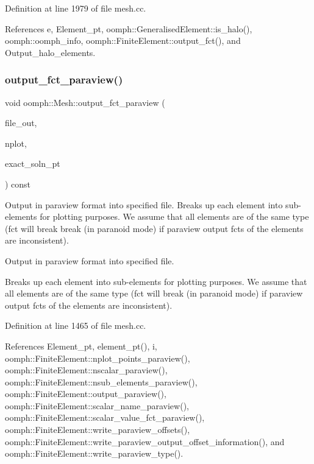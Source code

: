 Definition at line 1979 of file mesh.\+cc.



References e, Element\+\_\+pt, oomph\+::\+Generalised\+Element\+::is\+\_\+halo(), oomph\+::oomph\+\_\+info, oomph\+::\+Finite\+Element\+::output\+\_\+fct(), and Output\+\_\+halo\+\_\+elements.

\mbox{\label{classoomph_1_1Mesh_a8bba347dea4098f0bf7142db582adc38}} 
\subsubsection{\texorpdfstring{output\+\_\+fct\+\_\+paraview()}{output\_fct\_paraview()}}
{\footnotesize\ttfamily void oomph\+::\+Mesh\+::output\+\_\+fct\+\_\+paraview (\begin{DoxyParamCaption}\item[{std\+::ofstream \&}]{file\+\_\+out,  }\item[{const unsigned \&}]{nplot,  }\item[{\hyperlink{classoomph_1_1FiniteElement_a690fd33af26cc3e84f39bba6d5a85202}{Finite\+Element\+::\+Steady\+Exact\+Solution\+Fct\+Pt}}]{exact\+\_\+soln\+\_\+pt }\end{DoxyParamCaption}) const}



Output in paraview format into specified file. Breaks up each element into sub-\/elements for plotting purposes. We assume that all elements are of the same type (fct will break break (in paranoid mode) if paraview output fcts of the elements are inconsistent). 

Output in paraview format into specified file.

Breaks up each element into sub-\/elements for plotting purposes. We assume that all elements are of the same type (fct will break (in paranoid mode) if paraview output fcts of the elements are inconsistent). 

Definition at line 1465 of file mesh.\+cc.



References Element\+\_\+pt, element\+\_\+pt(), i, oomph\+::\+Finite\+Element\+::nplot\+\_\+points\+\_\+paraview(), oomph\+::\+Finite\+Element\+::nscalar\+\_\+paraview(), oomph\+::\+Finite\+Element\+::nsub\+\_\+elements\+\_\+paraview(), oomph\+::\+Finite\+Element\+::output\+\_\+paraview(), oomph\+::\+Finite\+Element\+::scalar\+\_\+name\+\_\+paraview(), oomph\+::\+Finite\+Element\+::scalar\+\_\+value\+\_\+fct\+\_\+paraview(), oomph\+::\+Finite\+Element\+::write\+\_\+paraview\+\_\+offsets(), oomph\+::\+Finite\+Element\+::write\+\_\+paraview\+\_\+output\+\_\+offset\+\_\+information(), and oomph\+::\+Finite\+Element\+::write\+\_\+paraview\+\_\+type().



